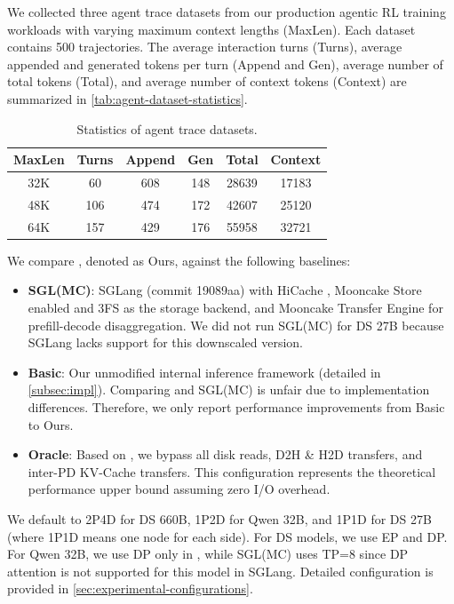 We collected three agent trace datasets from our production agentic RL training workloads with varying maximum context lengths (MaxLen). Each dataset contains 500 trajectories. The average interaction turns (Turns), average appended and generated tokens per turn (Append and Gen), average number of total tokens (Total), and average number of context tokens (Context) are summarized in \autoref{tab:agent-dataset-statistics}. 

\begin{table}[t!]
\centering
\caption{\normalfont Statistics of agent trace datasets.}
\begin{tabular}{cccccc}
\toprule
\textbf{MaxLen} & \textbf{Turns} & \textbf{Append} & \textbf{Gen} & \textbf{Total} & \textbf{Context} \\
\midrule
32K  &  60 & 608  & 148 & 28639 & 17183 \\
48K  & 106 & 474  & 172 & 42607 & 25120 \\
64K  & 157 & 429  & 176 & 55958 & 32721 \\
\bottomrule
\end{tabular}
\label{tab:agent-dataset-statistics}
\end{table}


We compare \sysname, denoted as Ours, against the following baselines:

\begin{itemize}[leftmargin=*]
\item \textbf{SGL(MC)}: SGLang \cite{NIPS24:SGLang} (commit 19089aa) with HiCache \cite{Hicache}, Mooncake \cite{FAST25:Mooncake} Store enabled and 3FS as the storage backend, and Mooncake Transfer Engine for prefill-decode disaggregation.
We did not run SGL(MC) for DS 27B because SGLang lacks support for this downscaled version.
\item \textbf{Basic}: Our unmodified internal inference framework (detailed in \autoref{subsec:impl}).
Comparing \sysname and SGL(MC) is unfair due to implementation differences.
Therefore, we only report performance improvements from Basic to Ours.
\item \textbf{Oracle}: Based on \sysname, we bypass all disk reads, D2H \& H2D transfers, and inter-PD KV-Cache transfers.
This configuration represents the theoretical performance upper bound assuming zero I/O overhead.
\end{itemize}

We default to 2P4D for DS 660B, 1P2D for Qwen 32B, and 1P1D for DS 27B (where 1P1D means one node for each side).
For DS models, we use EP and DP.
For Qwen 32B, we use DP only in \sysname, while SGL(MC) uses TP=8 since DP attention is not supported for this model in SGLang.
Detailed configuration is provided in \autoref{sec:experimental-configurations}. 

